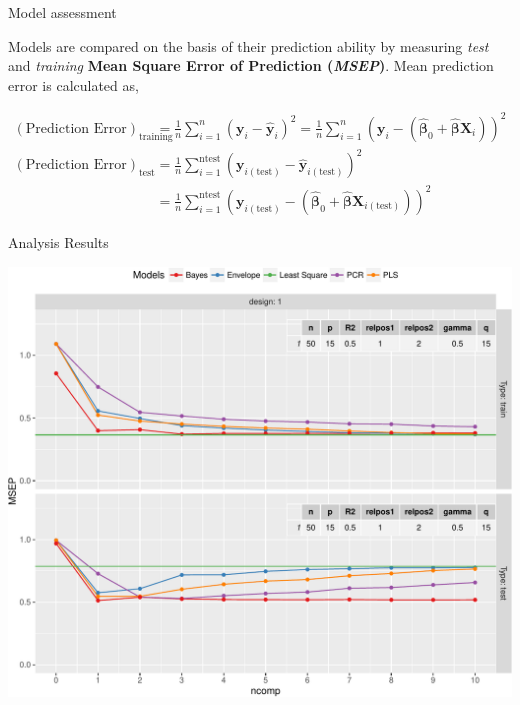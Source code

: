 \documentclass[ignorenonframetext,]{beamer}
\begin{document}
\begin{frame}{Model assessment}

Models are compared on the basis of their prediction ability by
measuring \emph{test} and \emph{training} \textbf{Mean Square Error of
Prediction (\emph{MSEP})}. Mean prediction error is calculated as,

\[
\begin{aligned}
\left(\text{Prediction Error}\right)_\text{training} &= \frac{1}{n}\sum_{i = 1}^n\left({\boldsymbol{y}_i - \hat{\boldsymbol{y}}_i}\right)^2 = \frac{1}{n}\sum_{i = 1}^n\left({\boldsymbol{y}_i - \left(\hat{\boldsymbol{\beta}}_0 + \hat{\boldsymbol{\beta}}\boldsymbol{X}_i\right)}\right)^2 \\
\left(\text{Prediction Error}\right)_\text{test} &= \frac{1}{n}\sum_{i = 1}^\text{ntest}\left({\boldsymbol{y}_{i\left(\text{test}\right)} - \hat{\boldsymbol{y}}_{i\left(\text{test}\right)}}\right)^2 \\ &= \frac{1}{n}\sum_{i = 1}^\text{ntest}\left({\boldsymbol{y}_{i\left(\text{test}\right)} - \left(\hat{\boldsymbol{\beta}}_0 + \hat{\boldsymbol{\beta}}\boldsymbol{X}_{i\left(\text{test}\right)}\right)}\right)^2
\end{aligned}
\]

\end{frame}

\begin{frame}{Analysis Results}

\begin{center}\includegraphics{Main_files/figure-beamer/unnamed-chunk-6-1} \end{center}

\end{frame}
\end{document}
